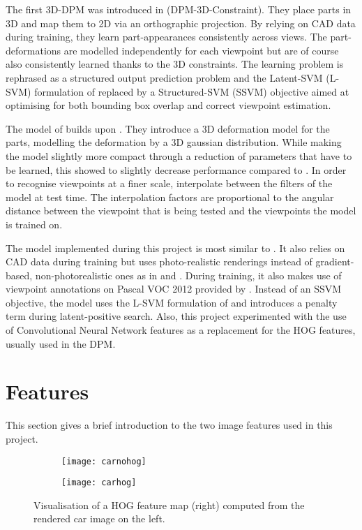 The first 3D-DPM was introduced in \cite{6248075} (DPM-3D-Constraint). They place parts in 3D and map them to 2D via an orthographic projection. By relying on CAD data during training, they learn part-appearances consistently across views. The part-deformations are modelled independently for each viewpoint but are of course also consistently learned thanks to the 3D constraints. The learning problem is rephrased as a structured output prediction problem and the Latent-SVM (L-SVM) formulation of \cite{5255236} replaced by a Structured-SVM (SSVM) objective aimed at optimising for both bounding box overlap and correct viewpoint estimation.

The model of \cite{Pepik:2012aa} builds upon \cite{6248075}. They introduce a 3D deformation model for the parts, modelling the deformation by a 3D gaussian distribution. While making the model slightly more compact through a reduction of parameters that have to be learned, this showed to slightly decrease performance compared to \cite{6248075}. In order to recognise viewpoints at a finer scale,  \cite{Pepik:2012aa} interpolate between the filters of the model at test time. The interpolation factors are proportional to the angular distance between the viewpoint that is being tested and the viewpoints the model is trained on.

The model implemented during this project is most similar to \cite{6248075}. It also relies on CAD data during training but uses photo-realistic renderings instead of gradient-based, non-photorealistic ones as in \cite{6248075} and \cite{Pepik:2012aa}. During training, it also makes use of viewpoint annotations on Pascal VOC 2012 provided by \cite{xiang_wacv14}. Instead of an SSVM objective, the model uses the L-SVM formulation of \cite{5255236} and introduces a penalty term during latent-positive search. Also, this project experimented with the use of Convolutional Neural Network features as a replacement for the HOG features, usually used in the DPM.

\section{Features}
This section gives a brief introduction to the two image features used in this project.

\begin{figure}
\begin{center}
        \begin{subfigure}[b]{0.49\textwidth}
                \texttt{[image: carnohog]}
        \end{subfigure}
        \begin{subfigure}[b]{0.49\textwidth}
               \texttt{[image: carhog]}
        \end{subfigure}
\caption{Visualisation of a HOG feature map (right) computed from the rendered car image on the left.}
\label{fig:carhog}
\end{center}
\end{figure}

